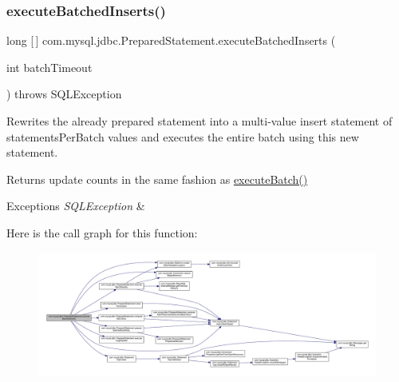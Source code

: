\subsubsection{\texorpdfstring{execute\+Batched\+Inserts()}{executeBatchedInserts()}}
{\footnotesize\ttfamily long \mbox{[}$\,$\mbox{]} com.\+mysql.\+jdbc.\+Prepared\+Statement.\+execute\+Batched\+Inserts (\begin{DoxyParamCaption}\item[{int}]{batch\+Timeout }\end{DoxyParamCaption}) throws S\+Q\+L\+Exception\hspace{0.3cm}{\ttfamily [protected]}}

Rewrites the already prepared statement into a multi-\/value insert statement of \textquotesingle{}statements\+Per\+Batch\textquotesingle{} values and executes the entire batch using this new statement.

\begin{DoxyReturn}{Returns}
update counts in the same fashion as \mbox{\hyperlink{classcom_1_1mysql_1_1jdbc_1_1_statement_impl_acf49c07c2b02c99e25719bb916bc0b39}{execute\+Batch()}}
\end{DoxyReturn}

\begin{DoxyExceptions}{Exceptions}
{\em S\+Q\+L\+Exception} & \\
\hline
\end{DoxyExceptions}
Here is the call graph for this function\+:
\nopagebreak
\begin{figure}[H]
\begin{center}
\leavevmode
\includegraphics[width=350pt]{classcom_1_1mysql_1_1jdbc_1_1_prepared_statement_a4b54450205db6b099922240e4f2e72a0_cgraph}
\end{center}
\end{figure}
\mbox{\label{classcom_1_1mysql_1_1jdbc_1_1_prepared_statement_a0a87e79e103adae56e63a967e64c167c}} 
